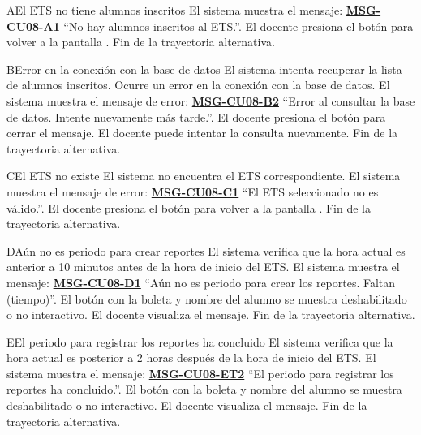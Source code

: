 \begin{UCtrayectoriaA}{A}{El ETS no tiene alumnos inscritos}
	\UCpaso El sistema muestra el mensaje: \textbf{\hyperref[msg:CU08-A1]{MSG-CU08-A1}}{ ``No hay alumnos inscritos al ETS.''}.
	\UCpaso[\UCactor] El docente presiona el botón  para volver a la pantalla .
	\UCpaso Fin de la trayectoria alternativa.
\end{UCtrayectoriaA}
\begin{UCtrayectoriaA}{B}{Error en la conexión con la base de datos}
	\UCpaso El sistema intenta recuperar la lista de alumnos inscritos.
	\UCpaso Ocurre un error en la conexión con la base de datos.
	\UCpaso El sistema muestra el mensaje de error: \textbf{\hyperref[msg:CU08-E2]{MSG-CU08-B2}}{ ``Error al consultar la base de datos. Intente nuevamente más tarde.''}.
	\UCpaso[\UCactor] El docente presiona el botón  para cerrar el mensaje.
	\UCpaso[\UCactor] El docente puede intentar la consulta nuevamente.
	\UCpaso Fin de la trayectoria alternativa.
\end{UCtrayectoriaA}
\begin{UCtrayectoriaA}{C}{El ETS no existe}
	\UCpaso El sistema no encuentra el ETS correspondiente.
	\UCpaso El sistema muestra el mensaje de error: \textbf{\hyperref[msg:CU08-C1]{MSG-CU08-C1}}{ ``El ETS seleccionado no es válido.''}.
	\UCpaso[\UCactor] El docente presiona el botón  para volver a la pantalla .
	\UCpaso Fin de la trayectoria alternativa.
\end{UCtrayectoriaA}
\begin{UCtrayectoriaA}{D}{Aún no es periodo para crear reportes}
	\UCpaso El sistema verifica que la hora actual es anterior a 10 minutos antes de la hora de inicio del ETS.
	\UCpaso El sistema muestra el mensaje: \textbf{\hyperref[msg:CU08-D1]{MSG-CU08-D1}}{ ``Aún no es periodo para crear los reportes. Faltan (tiempo)''}.
	\UCpaso El botón con la boleta y nombre del alumno se muestra deshabilitado o no interactivo.
	\UCpaso[\UCactor] El docente visualiza el mensaje.
	\UCpaso Fin de la trayectoria alternativa.
\end{UCtrayectoriaA}
\begin{UCtrayectoriaA}{E}{El periodo para registrar los reportes ha concluido}
	\UCpaso El sistema verifica que la hora actual es posterior a 2 horas después de la hora de inicio del ETS.
	\UCpaso El sistema muestra el mensaje: \textbf{\hyperref[msg:CU08-E2]{MSG-CU08-ET2}}{ ``El periodo para registrar los reportes ha concluido.''}.
	\UCpaso El botón con la boleta y nombre del alumno se muestra deshabilitado o no interactivo.
	\UCpaso[\UCactor] El docente visualiza el mensaje.
	\UCpaso Fin de la trayectoria alternativa.
\end{UCtrayectoriaA}
